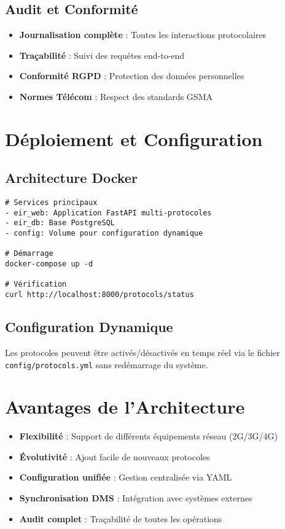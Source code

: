 \documentclass[11pt]{article}
\begin{document}
\subsection{Audit et Conformité}

\begin{itemize}
    \item \textbf{Journalisation complète} : Toutes les interactions protocolaires
    \item \textbf{Traçabilité} : Suivi des requêtes end-to-end
    \item \textbf{Conformité RGPD} : Protection des données personnelles
    \item \textbf{Normes Télécom} : Respect des standards GSMA
\end{itemize}

\section{Déploiement et Configuration}

\subsection{Architecture Docker}

\begin{lstlisting}[caption=Services Docker]
# Services principaux
- eir_web: Application FastAPI multi-protocoles
- eir_db: Base PostgreSQL
- config: Volume pour configuration dynamique

# Démarrage
docker-compose up -d

# Vérification
curl http://localhost:8000/protocols/status
\end{lstlisting}

\subsection{Configuration Dynamique}

Les protocoles peuvent être activés/désactivés en temps réel via le fichier \texttt{config/protocols.yml} sans redémarrage du système.

\section{Avantages de l'Architecture}

\begin{itemize}
    \item \textbf{Flexibilité} : Support de différents équipements réseau (2G/3G/4G)
    \item \textbf{Évolutivité} : Ajout facile de nouveaux protocoles
    \item \textbf{Configuration unifiée} : Gestion centralisée via YAML
    \item \textbf{Synchronisation DMS} : Intégration avec systèmes externes
    \item \textbf{Audit complet} : Traçabilité de toutes les opérations
\end{itemize}
\end{document}
